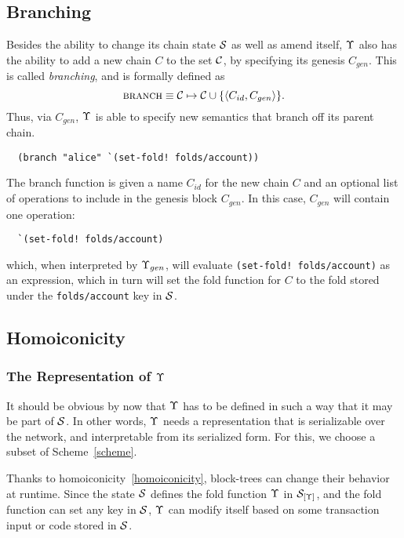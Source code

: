 \subsection{Branching}

Besides the ability to change its chain state $\mathcal{S}$ as well as amend itself,
$\Upsilon$ also has the ability to add a new chain $C$ to the set $\mathcal{C}$, by
specifying its genesis $C_{gen}$. This is called \emph{branching}, and is
formally defined as
\[
    \text{\normalfont\scshape branch} \equiv \mathcal{C} \mapsto \mathcal{C} \cup \{\langle C_{id}, C_{gen} \rangle\}.
\]
Thus, via $C_{gen}$, $\Upsilon$ is able to specify new semantics that branch off
its parent chain.

\begin{verbatim}
  (branch "alice" `(set-fold! folds/account))
\end{verbatim}

The branch function is given a name $C_{id}$ for the new chain $C$ and an
optional list of operations to include in the genesis block $C_{gen}$. In this
case, $C_{gen}$ will contain one operation:

\begin{verbatim}
  `(set-fold! folds/account)
\end{verbatim}
which, when interpreted by $\Upsilon_{gen}$, will evaluate \verb|(set-fold! folds/account)|
as an expression, which in turn will set the fold function for $C$ to the fold stored
under the \texttt{folds/account} key in $\mathcal{S}$.

\subsection{Homoiconicity}

\subsubsection{The Representation of $\Upsilon$}

It should be obvious by now that $\Upsilon$ has to be defined in such a way that
it may be part of $\mathcal{S}$. In other words, $\Upsilon$ needs a representation
that is serializable over the network, and interpretable from its serialized
form. For this, we choose a subset of Scheme~\ref{scheme}.

Thanks to homoiconicity~\ref{homoiconicity}, block-trees can change their
behavior at runtime. Since the state $\mathcal{S}$ defines the fold function $\Upsilon$
in $\mathcal{S}_{[\Upsilon]}$, and the fold function can set any key in $\mathcal{S}$,
$\Upsilon$ can modify itself based on some transaction input or code stored in
$\mathcal{S}$.

